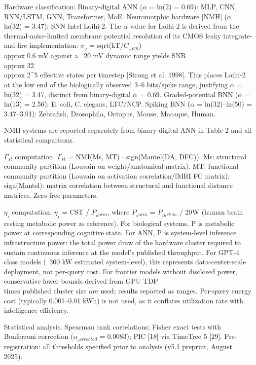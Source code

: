 \documentclass[a4paper,12pt]{article}
\begin{document}
Hardware classification: Binary-digital ANN ($\alpha$ = ln(2) = 0.69): MLP, CNN, RNN/LSTM, GNN, Transformer, MoE. Neuromorphic hardware [NMH\dag] ($\alpha$ = ln(32) = 3.47): SNN Intel Loihi-2. The $\alpha$ value for Loihi-2 is derived from the thermal-noise-limited membrane potential resolution of its CMOS leaky integrate-and-fire implementation: $\sigma_{_V}$ = sqrt(kT/$C_{_mem}$)  \\approx  0.6 mV against a ~20 mV dynamic range yields SNR  \\approx  32  \\approx  2^5 effective states per timestep [Strong et al. 1998]. This places Loihi-2 at the low end of the biologically observed 3--6 bits/spike range, justifying $\alpha$ = ln(32) = 3.47, distinct from binary-digital $\alpha$ = 0.69. Graded-potential BNN ($\alpha$ = ln(13) = 2.56): E. coli, C. elegans, LTC/NCP. Spiking BNN ($\alpha$ = ln(32)--ln(50) = 3.47--3.91): Zebrafish, Drosophila, Octopus, Mouse, Macaque, Human.


\dag{}NMH systems are reported separately from binary-digital ANN in Table 2 and all statistical comparisons.


$\Gamma_{st}$ computation. $\Gamma_{st}$ = NMI(Ms, MT)  $\cdot$  sign(Mantel(DA, DFC)). Ms: structural community partition (Louvain on weight/anatomical matrix). MT: functional community partition (Louvain on activation correlation/fMRI FC matrix). sign(Mantel): matrix correlation between structural and functional distance matrices. Zero free parameters.


$\eta_{_I}$ computation. $\eta_{_I}$ = CST / $P_{_norm}$, where $P_{_norm}$ = $P_{_system}$ / 20W (human brain resting metabolic power as reference). For biological systems, P is metabolic power at corresponding cognitive state. For ANN, P is system-level inference infrastructure power: the total power draw of the hardware cluster required to sustain continuous inference at the model's published throughput. For GPT-4 class models (~300 kW estimated system-level), this represents data-center-scale deployment, not per-query cost. For frontier models without disclosed power, conservative lower bounds derived from GPU TDP  \\times  published cluster size are used; results reported as ranges. Per-query energy cost (typically 0.001--0.01 kWh) is not used, as it conflates utilization rate with intelligence efficiency.


Statistical analysis. Spearman rank correlations; Fisher exact tests with Bonferroni correction ($\alpha_{_corrected}$ = 0.0083); PIC [18] via TimeTree 5 [29]. Pre-registration: all thresholds specified prior to analysis (v5.1 preprint, August 2025).
\end{document}
